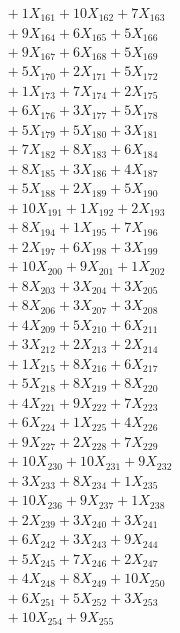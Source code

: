 \documentclass[a4paper,10pt]{article}
\begin{document}
{\begin{align}
&\;  + 1 X_{161} + 10 X_{162} + 7 X_{163} \\[0.5ex]\allowbreak
&\;  + 9 X_{164} + 6 X_{165} + 5 X_{166} \\[0.3ex]
&\;  + 9 X_{167} + 6 X_{168} + 5 X_{169} \\[0.3ex]
&\;  + 5 X_{170} + 2 X_{171} + 5 X_{172} \\[0.3ex]
&\;  + 1 X_{173} + 7 X_{174} + 2 X_{175} \\[0.3ex]
&\;  + 6 X_{176} + 3 X_{177} + 5 X_{178} \\[0.3ex]
&\;  + 5 X_{179} + 5 X_{180} + 3 X_{181} \\[0.3ex]
&\;  + 7 X_{182} + 8 X_{183} + 6 X_{184} \\[0.3ex]
&\;  + 8 X_{185} + 3 X_{186} + 4 X_{187} \\[0.3ex]
&\;  + 5 X_{188} + 2 X_{189} + 5 X_{190} \\[0.3ex]
&\;  + 10 X_{191} + 1 X_{192} + 2 X_{193} \\[0.5ex]\allowbreak
&\;  + 8 X_{194} + 1 X_{195} + 7 X_{196} \\[0.3ex]
&\;  + 2 X_{197} + 6 X_{198} + 3 X_{199} \\[0.3ex]
&\;  + 10 X_{200} + 9 X_{201} + 1 X_{202} \\[0.3ex]
&\;  + 8 X_{203} + 3 X_{204} + 3 X_{205} \\[0.3ex]
&\;  + 8 X_{206} + 3 X_{207} + 3 X_{208} \\[0.3ex]
&\;  + 4 X_{209} + 5 X_{210} + 6 X_{211} \\[0.3ex]
&\;  + 3 X_{212} + 2 X_{213} + 2 X_{214} \\[0.3ex]
&\;  + 1 X_{215} + 8 X_{216} + 6 X_{217} \\[0.3ex]
&\;  + 5 X_{218} + 8 X_{219} + 8 X_{220} \\[0.3ex]
&\;  + 4 X_{221} + 9 X_{222} + 7 X_{223} \\[0.5ex]\allowbreak
&\;  + 6 X_{224} + 1 X_{225} + 4 X_{226} \\[0.3ex]
&\;  + 9 X_{227} + 2 X_{228} + 7 X_{229} \\[0.3ex]
&\;  + 10 X_{230} + 10 X_{231} + 9 X_{232} \\[0.3ex]
&\;  + 3 X_{233} + 8 X_{234} + 1 X_{235} \\[0.3ex]
&\;  + 10 X_{236} + 9 X_{237} + 1 X_{238} \\[0.3ex]
&\;  + 2 X_{239} + 3 X_{240} + 3 X_{241} \\[0.3ex]
&\;  + 6 X_{242} + 3 X_{243} + 9 X_{244} \\[0.3ex]
&\;  + 5 X_{245} + 7 X_{246} + 2 X_{247} \\[0.3ex]
&\;  + 4 X_{248} + 8 X_{249} + 10 X_{250} \\[0.3ex]
&\;  + 6 X_{251} + 5 X_{252} + 3 X_{253} \\[0.5ex]\allowbreak
&\;  + 10 X_{254} + 9 X_{255}\nonumber
\end{align}
}
\end{document}
